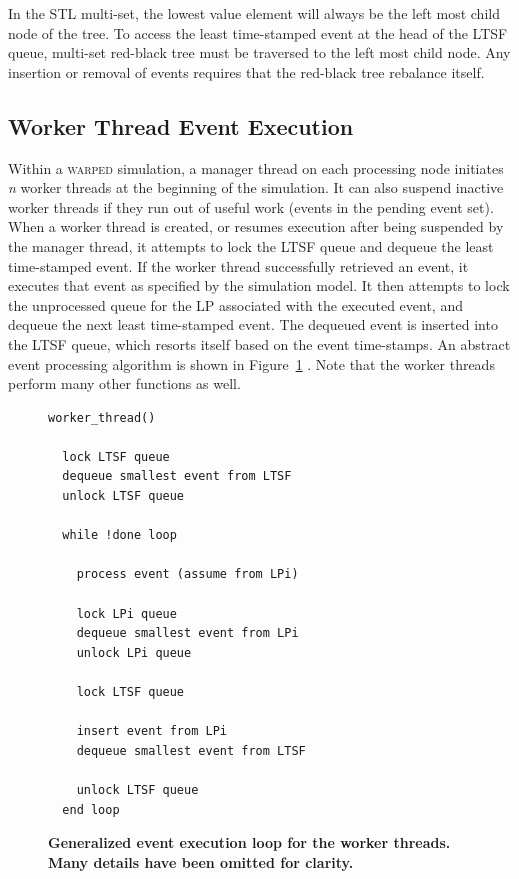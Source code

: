 \documentclass{sig-alternate}
\begin{document}
In the STL multi-set, the lowest value element will always be the left most child node of
the tree.  To access the least time-stamped event at the head of the LTSF queue, multi-set
red-black tree must be traversed to the left most child node.  Any insertion or removal of
events requires that the red-black tree rebalance itself.

\subsection{Worker Thread Event Execution}

Within a \textsc{warped} simulation, a manager thread on each processing node initiates
\emph{n} worker threads at the beginning of the simulation.  It can also suspend inactive
worker threads if they run out of useful work (events in the pending event set).  When a
worker thread is created, or resumes execution after being suspended by the manager
thread, it attempts to lock the LTSF queue and dequeue the least time-stamped event.  If
the worker thread successfully retrieved an event, it executes that event as specified by
the simulation model.  It then attempts to lock the unprocessed queue for the LP
associated with the executed event, and dequeue the next least time-stamped event.  The
dequeued event is inserted into the LTSF queue, which resorts itself based on the event
time-stamps.  An abstract event processing algorithm is shown in
Figure~\ref{workerThreadAlgorithm} \cite{dickman}.  Note that the worker threads perform
many other functions as well.

\begin{figure}
\begin{verbatim}
worker_thread()

  lock LTSF queue
  dequeue smallest event from LTSF
  unlock LTSF queue

  while !done loop

    process event (assume from LPi)

    lock LPi queue 
    dequeue smallest event from LPi
    unlock LPi queue

    lock LTSF queue

    insert event from LPi
    dequeue smallest event from LTSF

    unlock LTSF queue
  end loop
\end{verbatim}
\caption{\textbf{Generalized event execution loop for the worker threads.  Many details
    have been omitted for clarity.}}\label{workerThreadAlgorithm}
\end{figure}
\end{document}
